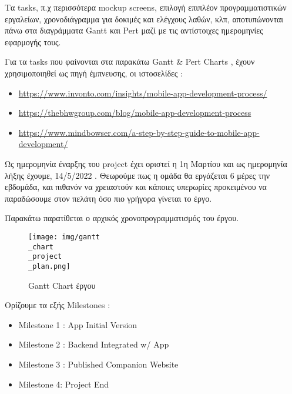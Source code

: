 \documentclass{../ol-softwaremanual}
\begin{document}
	Τα \en tasks, \gr π.χ περισσότερα \en mockup screens\gr, επιλογή επιπλέον προγραμματιστικών εργαλείων,  χρονοδιάγραμμα για δοκιμές και ελέγχους λαθών, κλπ, αποτυπώνονται πάνω στα διαγράμματα \en Gantt \gr και \en Pert \gr μαζί με τις αντίστοιχες ημερομηνίες εφαρμογής τους. \break
	
	Για τα \en tasks \gr που φαίνονται στα παρακάτω \en Gantt \& Pert Charts \gr, έχουν χρησιμοποιηθεί ως πηγή έμπνευσης, οι ιστοσελίδες : 
	
	\begin{itemize}
		\item \en \url{https://www.invonto.com/insights/mobile-app-development-process/}
		\item \en \url{https://thebhwgroup.com/blog/mobile-app-development-process}
		\item \en \url{https://www.mindbowser.com/a-step-by-step-guide-to-mobile-app-development/}
	\end{itemize}
	\vspace{5pt}
	
	Ως ημερομηνία έναρξης του \en project \gr έχει οριστεί η 1η Μαρτίου και ως ημερομηνία λήξης έχουμε, 14/5/2022 . Θεωρούμε πως η ομάδα θα εργάζεται 6 μέρες την εβδομάδα, και πιθανόν να χρειαστούν και κάποιες υπερωρίες προκειμένου να παραδώσουμε στον πελάτη όσο πιο γρήγορα γίνεται το έργο. \\
	
	\newpage
	

\vspace{10pt}	
	
	Παρακάτω παρατίθεται ο αρχικός χρονοπρογραμματισμός του έργου.
	
	\vspace{10pt}
	

	\flushleft
	
	\begin{figure}[htbp!]
		
		\texttt{[image: img/gantt\\\_chart\\\_project\\\_plan.png]}
		\caption{\en Gantt Chart \gr έργου}
		
		
	\end{figure}
	
	\vspace{20pt}
Ορίζουμε τα εξής \en Milestones \gr :

\begin{itemize}
	\item \en Milestone 1 : App Initial Version
	\item \en Milestone 2 : Backend Integrated w/ App
	\item \en Milestone 3 : Published Companion Website
	\item \en Milestone 4: Project End
\end{itemize}
	
\end{document}
